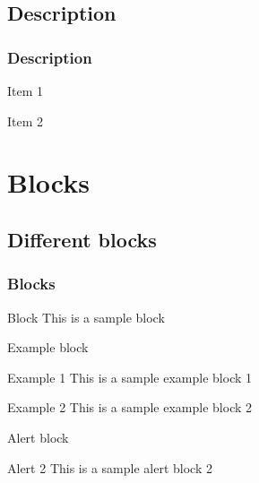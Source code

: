 \documentclass[aspectratio=169]{beamer}
\begin{document}
\subsection{Description}
\begin{frame}
	\frametitle{Description}
		\begin{description}
			\item <1> [One] Item 1
			\item <2> [Two] Item 2
		\end{description}
\end{frame}	

\section{Blocks}
\subsection{Different blocks}
\begin{frame}
	\frametitle{Blocks}
		\begin{block}{Block}
			This is a sample block
		\end{block}
\end{frame}
\begin{frame}{Example block} %
    \begin{minipage}{0.45\textwidth}
		\begin{exampleblock}{Example 1}
			This is a sample example block 1
		\end{exampleblock}
    \end{minipage}%
    \hfill
    \begin{minipage}{0.45\textwidth}
		\begin{exampleblock}{Example 2}
			This is a sample example block 2
		\end{exampleblock}
    \end{minipage}
\end{frame}
\begin{frame}{Alert block}
    \hfill
     {
        \begin{minipage}{0.45\textwidth}
            \begin{alertblock}{Alert 2}
			         This is a sample alert block 2
		      \end{alertblock}
        \end{minipage}
    }
\end{frame}	
\end{document}
